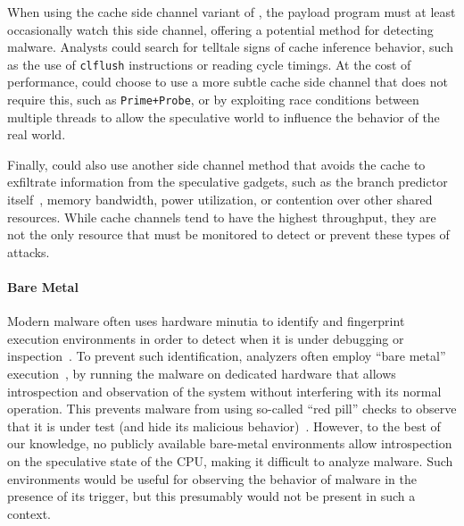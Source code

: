 When using the cache side channel variant of \speculake, the payload
program must at least occasionally watch this side channel, offering a
potential method for detecting \speculake malware.
Analysts could search for telltale signs of cache inference behavior, such as
the use of \texttt{clflush} instructions or reading cycle timings. At the cost
of performance, \speculake could choose to use a more subtle cache side channel
that does not require this, such as \texttt{Prime+Probe}, or by exploiting race
conditions between multiple threads to allow the speculative world to influence
the behavior of the real world.

Finally, \speculake could also use another side channel method that
avoids the cache
to exfiltrate information from the speculative gadgets, such as the branch
predictor itself~\cite{evtyushkin2018branchscope}, memory bandwidth, power
utilization, or contention over other shared resources. While cache 
channels tend to have the highest throughput, they are not the only 
resource that must be monitored to detect or prevent these types of attacks. 


\paragraph{Bare Metal}
Modern malware often uses hardware minutia to identify and fingerprint execution
environments in order to detect when it is under debugging or
inspection~\cite{lindorfer2011detecting,balzarotti2010efficient,paleari2009fistful}.
To prevent such identification, analyzers often employ ``bare metal''
execution~\cite{kirat2011barebox}, by running the malware on
dedicated hardware that allows introspection and observation of the system
without interfering with its normal operation. This prevents malware from using
so-called ``red pill'' checks to observe that it is under test (and hide its
malicious behavior)~\cite{kirat2014barecloud}. However, to the best of our
knowledge, no publicly available bare-metal environments allow introspection on
the speculative state of the CPU, making it difficult to analyze \speculake
malware. Such environments would be useful for observing the behavior of
\speculake malware in the presence of its trigger, but this presumably would not be
present in such a context.

